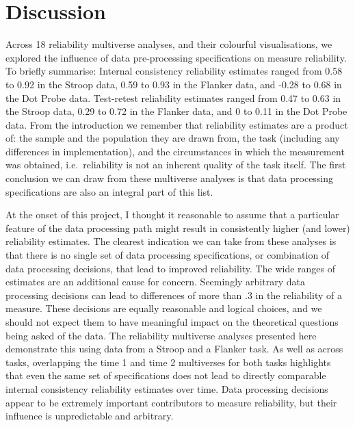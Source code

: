 \documentclass[
  man,floatsintext]{apa6}
\begin{document}
\hypertarget{discussion}{%
\section{Discussion}\label{discussion}}

Across 18 reliability multiverse analyses, and their colourful visualisations, we explored the influence of data pre-processing specifications on measure reliability. To briefly summarise: Internal consistency reliability estimates ranged from 0.58 to 0.92 in the Stroop data, 0.59 to 0.93 in the Flanker data, and -0.28 to 0.68 in the Dot Probe data. Test-retest reliability estimates ranged from 0.47 to 0.63 in the Stroop data, 0.29 to 0.72 in the Flanker data, and 0 to 0.11 in the Dot Probe data. From the introduction we remember that reliability estimates are a product of: the sample and the population they are drawn from, the task (including any differences in implementation), and the circumstances in which the measurement was obtained, i.e.~reliability is not an inherent quality of the task itself. The first conclusion we can draw from these multiverse analyses is that data processing specifications are also an integral part of this list.

At the onset of this project, I thought it reasonable to assume that a particular feature of the data processing path might result in consistently higher (and lower) reliability estimates. The clearest indication we can take from these analyses is that there is no single set of data processing specifications, or combination of data processing decisions, that lead to improved reliability. The wide ranges of estimates are an additional cause for concern. Seemingly arbitrary data processing decisions can lead to differences of more than .3 in the reliability of a measure. These decisions are equally reasonable and logical choices, and we should not expect them to have meaningful impact on the theoretical questions being asked of the data. The reliability multiverse analyses presented here demonstrate this using data from a Stroop and a Flanker task. As well as across tasks, overlapping the time 1 and time 2 multiverses for both tasks highlights that even the same set of specifications does not lead to directly comparable internal consistency reliability estimates over time. Data processing decisions appear to be extremely important contributors to measure reliability, but their influence is unpredictable and arbitrary.
\end{document}
